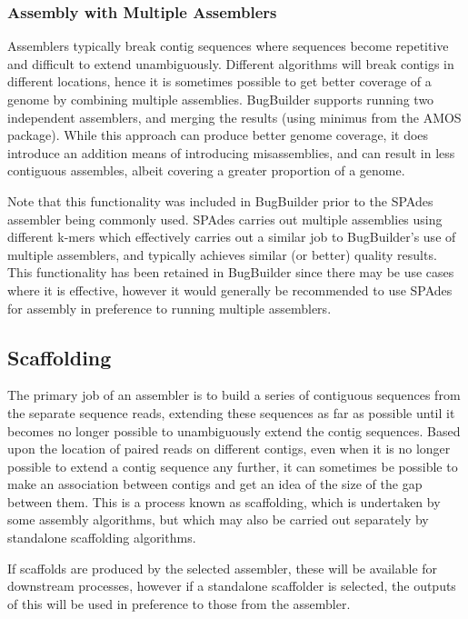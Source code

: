 \documentclass[a4paper,10pt]{article}
\begin{document}
\subsubsection{Assembly with Multiple Assemblers}
\label{subsec:multiassem}

Assemblers typically break contig sequences where sequences become repetitive
and difficult to extend unambiguously. Different algorithms will break contigs
in different locations, hence it is sometimes possible to get better coverage
of a genome by combining multiple assemblies. BugBuilder supports running two
independent assemblers, and merging the results (using minimus from the AMOS
package). While this approach can produce better genome coverage, it does
introduce an addition means of introducing misassemblies, and can result in
less contiguous assembles, albeit covering a greater proportion of a genome. 

Note that this functionality was included in BugBuilder
prior to the SPAdes assembler being commonly used. SPAdes carries out multiple
assemblies using different k-mers which effectively carries out a similar job
to BugBuilder's use of multiple assemblers, and typically achieves similar (or
better) quality results. This functionality has been retained in BugBuilder
since there may be use cases where it is effective, however it would generally
be recommended to use SPAdes for assembly in preference to running multiple
assemblers.


\subsection{Scaffolding}

The primary job of an assembler is to build a series of contiguous sequences
from the separate sequence reads, extending these sequences as far as possible
until it becomes no longer possible to unambiguously extend the contig
sequences. Based upon the location of paired reads on different contigs, even
when it is no longer possible to extend a contig sequence any further, it can
sometimes be possible to make an association between  contigs and get an idea
of the size of the gap between them. This is a process known as scaffolding,
which is undertaken by some assembly algorithms, but which may also be carried
out separately by standalone scaffolding algorithms.

If scaffolds are produced by the selected assembler, these will be available
for downstream processes, however if a standalone scaffolder is selected, the
outputs of this will be used in preference to those from the assembler. 
\end{document}

